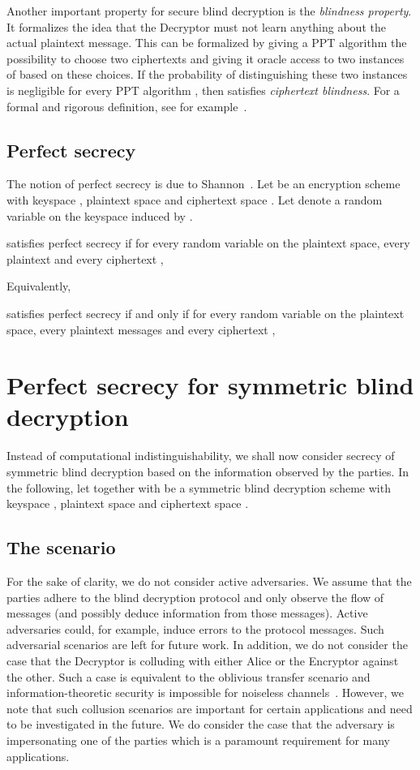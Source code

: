 \documentclass[10pt,journal]{IEEEtran}
\begin{document}
Another important property for secure blind decryption is the \emph{blindness property}.
It formalizes the idea that the Decryptor must not learn anything
about the actual plaintext message.
This can be formalized
by giving a PPT algorithm  the possibility to choose
two ciphertexts  and giving it oracle access
to two instances of  based on these choices. If the probability of distinguishing
these two instances is negligible for every PPT algorithm , then 
 satisfies \emph{ciphertext blindness}.
For a formal and rigorous definition, see for example~\cite{Green_2011}.



\subsection{Perfect secrecy}

The notion of perfect secrecy is due to Shannon~\cite{Shannon_1949}. Let  be an encryption
scheme with keyspace , plaintext space  and ciphertext space .
Let  denote a random variable on the keyspace
induced by .

satisfies perfect secrecy if for every random variable 
on the plaintext space, every plaintext  and every
ciphertext ,

Equivalently, 

satisfies perfect secrecy if and only if for every random variable 
on the plaintext space,
every plaintext messages  and every
ciphertext ,


\section{Perfect secrecy for symmetric blind decryption}
\label{sec:Perfect secrecy for symmetric blind decryption}

Instead of computational indistinguishability, we shall now consider secrecy of
symmetric blind decryption based on the information observed by the parties.
In the following, let  together with
 be a symmetric blind decryption
scheme with keyspace , plaintext space  and ciphertext space .

\subsection{The scenario}



For the sake of clarity, we do not consider active adversaries. We assume that the parties adhere to
the blind decryption protocol and only observe the flow of messages (and possibly deduce information from those messages).
Active adversaries could, for example, induce errors to the protocol messages.
Such adversarial scenarios are left for future work.
In addition, we do not consider the case that the Decryptor
is colluding with either Alice or the Encryptor
against the other.
Such a case is equivalent to the oblivious transfer scenario and information-theoretic security is impossible
for noiseless channels~\cite{Damgard_1999}.
However, we note that such collusion scenarios are important for certain applications and need to be investigated in the future.
We do consider the case that the adversary is impersonating one of the parties which is a paramount
requirement for many applications.
\end{document}
